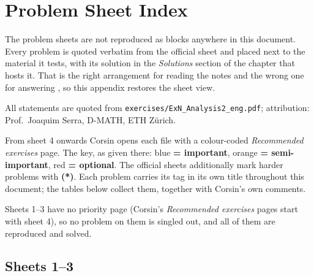 %
%
\chapter{Problem Sheet Index}
\label{ch:sheet_index}

The problem sheets are not reproduced as blocks anywhere in this document. Every problem is
quoted verbatim from the official sheet and placed next to the material it tests, with its
solution in the \emph{Solutions} section of the chapter that hosts it. That is the right
arrangement for reading the notes and the wrong one for answering , so
this appendix restores the sheet view.

All statements are quoted from \texttt{exercises/ExN\_Analysis2\_eng.pdf}; attribution:
Prof.\ Joaquim Serra, D-MATH, ETH Z\"urich.

\begin{notation}
\label{not:corsin_priority_key}
From sheet 4 onwards Corsin opens each file with a colour-coded \textit{Recommended exercises}
page. The key, as given there: blue \textbf{= important}, orange \textbf{= semi-important},
red \textbf{= optional}. The official sheets additionally mark harder problems with \textbf{(*)}.
Each problem carries its tag in its own title throughout this document; the tables below collect
them, together with Corsin's own comments.
\end{notation}

\begin{ainote}
Sheets 1--3 have no priority page (Corsin's \textit{Recommended exercises} pages start with
sheet 4), so no problem on them is singled out, and all of them are reproduced and solved.
\end{ainote}

\section{Sheets 1--3}
\label{sec:sheet_index_1_3}


